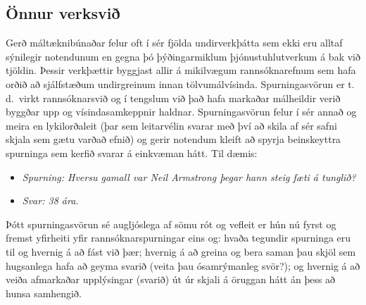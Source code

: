 \begin{multicols}{2}
\subsection{Önnur verksvið}
Gerð máltæknibúnaðar felur oft í sér fjölda undirverkþátta sem ekki eru alltaf sýnilegir notendunum en gegna þó þýðingarmiklum þjónustuhlutverkum á bak við tjöldin. Þessir verkþættir byggjast allir á mikilvægum rannsóknarefnum sem hafa orðið að sjálfstæðum undirgreinum innan tölvumálvísinda.
Spurningasvörun er t.\,d.~virkt rannsóknarsvið og í tengslum við það hafa markaðar málheildir verið byggðar upp og vísindasamkeppnir haldnar. 
Spurningasvörun felur í sér annað og meira en lykilorðaleit (þar sem leitarvélin svarar með því að skila af sér safni skjala sem gætu varðað efnið) og gerir notendum kleift að spyrja beinskeyttra spurninga sem kerfið svarar á einkvæman hátt. Til dæmis:
		
\begin{itemize}
\item[] \textit{Spurning: Hversu gamall var Neil Armstrong þegar hann steig fæti á tunglið?}
\item[] \textit{Svar: 38 ára.}
\end{itemize}

Þótt spurningasvörun sé augljóslega af sömu rót og vefleit er hún nú fyrst og fremst yfirheiti yfir rannsóknarspurningar eins og: hvaða tegundir spurninga eru til og hvernig á að fást við þær; hvernig á að greina og bera saman þau skjöl sem hugsanlega hafa að geyma svarið (veita þau ósamrýmanleg svör?); og hvernig á að veiða afmarkaðar upplýsingar (svarið) út úr skjali á öruggan hátt án þess að hunsa samhengið.


\end{multicols}
